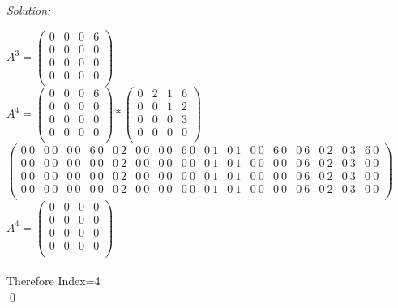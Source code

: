 \documentclass[12pt]{article}
\newenvironment{sol}
    {\emph{Solution:}
    }
    {
    \qed
    }
\begin{document}
\begin{sol}
$A^{3}=\left(
\begin{array}{cccc}
 0 & 0 & 0 & 6 \\
 0 & 0 & 0 & 0 \\
 0 & 0 & 0 & 0 \\
 0 & 0 & 0 & 0 \\
\end{array}
\right)$ \\

$A^{4}=\left(
\begin{array}{cccc}
 0 & 0 & 0 & 6 \\
 0 & 0 & 0 & 0 \\
 0 & 0 & 0 & 0 \\
 0 & 0 & 0 & 0 \\
\end{array}
\right)*\left(
\begin{array}{cccc}
 0 & 2 & 1 & 6 \\
 0 & 0 & 1 & 2 \\
 0 & 0 & 0 & 3 \\
 0 & 0 & 0 & 0 \\
\end{array}
\right)$ \\

$\left(
\begin{array}{cccccccccccccccc}
 0\ 0 & 0\ 0 & 0\ 0 & 6\ 0 & 0\ 2 & 0\ 0 & 0\ 0 & 6\ 0 & 0\ 1 & 0\ 1 & 0\ 0 & 6\ 0 & 0\ 6 & 0\ 2 & 0\ 3 & 6\ 0 \\
 0\ 0 & 0\ 0 & 0\ 0 & 0\ 0 & 0\ 2 & 0\ 0 & 0\ 0 & 0\ 0 & 0\ 1 & 0\ 1 & 0\ 0 & 0\ 0 & 0\ 6 & 0\ 2 & 0\ 3 & 0\ 0 \\
 0\ 0 & 0\ 0 & 0\ 0 & 0\ 0 & 0\ 2 & 0\ 0 & 0\ 0 & 0\ 0 & 0\ 1 & 0\ 1 & 0\ 0 & 0\ 0 & 0\ 6 & 0\ 2 & 0\ 3 & 0\ 0 \\
 0\ 0 & 0\ 0 & 0\ 0 & 0\ 0 & 0\ 2 & 0\ 0 & 0\ 0 & 0\ 0 & 0\ 1 & 0\ 1 & 0\ 0 & 0\ 0 & 0\ 6 & 0\ 2 & 0\ 3 & 0\ 0 \\
\end{array}
\right)$ \\

$A^{4}=\left(
\begin{array}{cccc}
 0 & 0 & 0 & 0 \\
 0 & 0 & 0 & 0 \\
 0 & 0 & 0 & 0 \\
 0 & 0 & 0 & 0 \\
\end{array}
\right)$\\ \\
Therefore Index=4\\
\end{sol}
\end{document}
